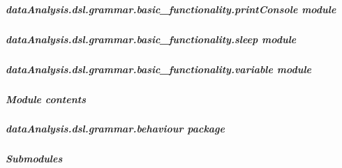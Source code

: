 \documentclass[letterpaper,10pt,english]{sphinxmanual}
\begin{document}
\subparagraph{dataAnalysis.dsl.grammar.basic\_functionality.printConsole module}
\label{dataAnalysis.dsl.grammar.basic_functionality:dataanalysis-dsl-grammar-basic-functionality-printconsole-module}

\subparagraph{dataAnalysis.dsl.grammar.basic\_functionality.sleep module}
\label{dataAnalysis.dsl.grammar.basic_functionality:dataanalysis-dsl-grammar-basic-functionality-sleep-module}\label{dataAnalysis.dsl.grammar.basic_functionality:module-dataAnalysis.dsl.grammar.basic_functionality.sleep}

\begin{fulllineitems}
\label{dataAnalysis.dsl.grammar.basic_functionality:dataAnalysis.dsl.grammar.basic_functionality.sleep.sleepAgent}
\end{fulllineitems}


\begin{fulllineitems}
\label{dataAnalysis.dsl.grammar.basic_functionality:dataAnalysis.dsl.grammar.basic_functionality.sleep.stringToInt}
\end{fulllineitems}



\subparagraph{dataAnalysis.dsl.grammar.basic\_functionality.variable module}
\label{dataAnalysis.dsl.grammar.basic_functionality:dataanalysis-dsl-grammar-basic-functionality-variable-module}

\subparagraph{Module contents}
\label{dataAnalysis.dsl.grammar.basic_functionality:module-contents}\label{dataAnalysis.dsl.grammar.basic_functionality:module-dataAnalysis.dsl.grammar.basic_functionality}

\subparagraph{dataAnalysis.dsl.grammar.behaviour package}
\label{dataAnalysis.dsl.grammar.behaviour::doc}\label{dataAnalysis.dsl.grammar.behaviour:dataanalysis-dsl-grammar-behaviour-package}

\subparagraph{Submodules}
\label{dataAnalysis.dsl.grammar.behaviour:submodules}
\end{document}
